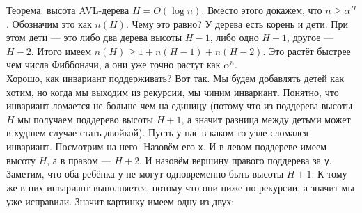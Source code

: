 \documentclass{article}
\newcommand{\pseudo}{PseudoLexer.py:PseudoLexer -x}
\newcommand{\pseudocode}[1]{\texttt{#1}}
\begin{document}
    Теорема: высота AVL-дерева $H=O(\log n)$. Вместо этого докажем, что $n\geqslant\alpha^H$. Обозначим это как $n(H)$. Чему это равно? У дерева есть корень и дети. При этом дети --- это либо два дерева высоты $H-1$, либо одно $H-1$, другое --- $H-2$. Итого имеем $n(H)\geqslant1+n(H-1)+n(H-2)$. Это растёт быстрее чем числа Фиббоначи, а они уже точно растут как $\alpha^n$.\\
    Хорошо, как инвариант поддерживать? Вот так. Мы будем добавлять детей как хотим, но когда мы выходим из рекурсии, мы чиним инвариант. Понятно, что инвариант ломается не больше чем на единицу (потому что из поддерева высоты $H$ мы получаем поддерево высоты $H+1$, а значит разница между детьми может в худшем случае стать двойкой). Пусть у нас в каком-то узле сломался инвариант. Посмотрим на него. Назовём его \pseudocode{x}. И в левом поддереве имеем высоту $H$, а в правом --- $H+2$. И назовём вершину правого поддерева за \pseudocode{y}. Заметим, что оба ребёнка \pseudocode{y} не могут одновременно быть высоты $H+1$. К тому же в них инвариант выполняется, потому что они ниже по рекурсии, а значит мы уже исправили. Значит картинку имеем одну из двух:
    \begin{center}
        \qquad\qquad
    \end{center}
\end{document}
